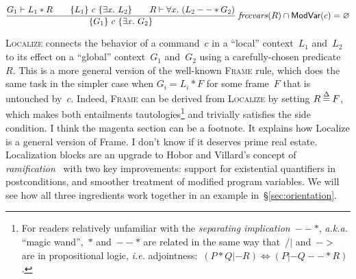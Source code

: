 
\begin{equation}
\label{eq:localize}
\frac
{G_1 |- L_1 * R \qquad
\{ L_1 \} ~ c ~ \{ \exists x.~ L_2 \} \qquad
R |- \forall x.~ (L_2 --* G_2) }
{\{ G_1 \} ~ c ~ \{ \exists x.~ G_2 \}} 
\; {\mathit{freevars}(R) \cap \mathsf{ModVar}(c) = \varnothing} 
\end{equation} 

\textsc{Localize} connects the behavior of a command~$c$ in a ``local'' context~$L_1$ 
and~$L_2$ to its effect on a ``global'' context~$G_1$ and~$G_2$ using a carefully-chosen 
predicate~$R$. This is a more general version of the well-known \textsc{Frame} rule, 
which does the same task in the simpler case when $G_i = L_i * F$ for some frame~$F$ that 
is untouched by~$c$.  {\color{magenta}Indeed, \textsc{Frame} can be derived 
from \textsc{Localize} by setting $R \mathbin{\stackrel{\Delta}{=}} F$, which makes both entailments 
tautologies\footnote{For readers relatively unfamiliar with the \emph{separating 
implication}~$--*$, \emph{a.k.a.} ``magic wand'',~$*$ and~$--*$ are related in the same 
way that~$/|$ and~$->$ are in propositional logic, \emph{i.e.} 
adjointness:~$(P * Q |- R) \Leftrightarrow (P |- Q --* R)$.} and trivially satisfies the 
side condition.} {\color{blue}I think the magenta section can be a footnote. It explains 
how Localize is a general version of Frame. I don't know if it deserves prime 
real estate.} 
Localization blocks are an upgrade to Hobor and Villard's concept of 
\emph{ramification}~\cite{blah} with two key improvements: support for existential 
quantifiers in postconditions, and smoother treatment of modified program variables.  
We will see how all three ingredients work together in an example 
in~\S\ref{sec:orientation}.


